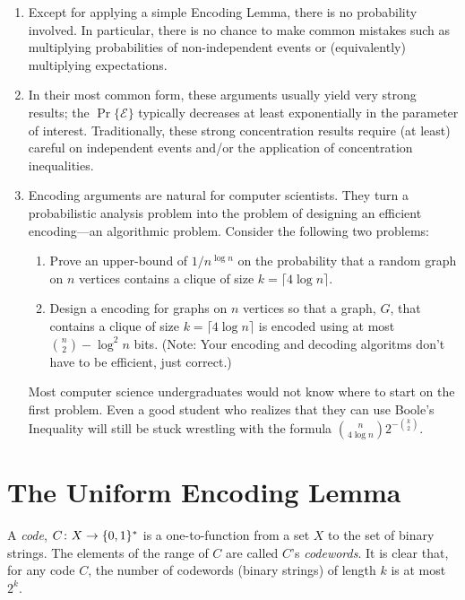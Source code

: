 \documentclass[lotsofwhite]{patmorin}
\begin{document}
\begin{enumerate}
  \item Except for applying a simple Encoding Lemma, there is no probability
  involved.  In particular, there is no chance to make common mistakes such
  as multiplying probabilities of non-independent events or (equivalently)
  multiplying expectations.
  
  \item In their most common form, these arguments usually yield very
  strong results; the $\Pr\{\mathcal{E}\}$ typically decreases at least
  exponentially in the parameter of interest. Traditionally, these strong
  concentration results require (at least) careful on independent events
  and/or the application of concentration inequalities.
  
  \item Encoding arguments are natural for computer scientists. They
  turn a probabilistic analysis problem into the problem of designing an
  efficient encoding---an algorithmic problem. Consider the following 
  two problems:
    \begin{enumerate}

    \item Prove an upper-bound of $1/n^{\log n}$ on the probability that
       a random graph on $n$ vertices contains a clique of size $k=\lceil
       4\log n\rceil$.

    \item Design a encoding for graphs on $n$ vertices so that a graph,
       $G$, that contains a clique of size $k=\lceil 4\log n\rceil$
       is encoded using at most $\binom{n}{2}-\log^2 n$ bits. (Note:
       Your encoding and decoding algoritms don't have to be efficient,
       just correct.)
    \end{enumerate}
  Most computer science undergraduates would not know where to start
  on the first problem.  Even a good student who realizes that
  they can use Boole's Inequality will still be stuck
  wrestling with the formula $\binom{n}{4\log n}2^{-\binom{k}{2}}$.  
\end{enumerate}



\section{The Uniform Encoding Lemma}

A \emph{code}, $C\colon X\to \{0,1\}^*$ is a one-to-function from
a set $X$ to the set of binary strings.  The elements of the range of
$C$ are called $C$'s \emph{codewords}.  It is clear that, for
any code $C$, the number of codewords (binary strings) of length $k$
is at most $2^k$.
\end{document}
